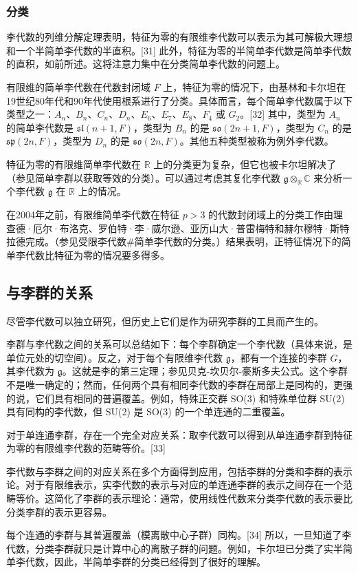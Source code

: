 \subsubsection{分类}
李代数的列维分解定理表明，特征为零的有限维李代数可以表示为其可解极大理想和一个半简单李代数的半直积。[31] 此外，特征为零的半简单李代数是简单李代数的直积，如前所述。这将注意力集中在分类简单李代数的问题上。

有限维的简单李代数在代数封闭域 \(F\) 上，特征为零的情况下，由基林和卡尔坦在19世纪80年代和90年代使用根系进行了分类。具体而言，每个简单李代数属于以下类型之一：\(A_n\)、\(B_n\)、\(C_n\)、\(D_n\)、\(E_6\)、\(E_7\)、\(E_8\)、\(F_4\) 或 \(G_2\)。[32] 其中，类型为 \(A_n\) 的简单李代数是 \(\mathfrak{sl}(n+1,F)\)，类型为 \(B_n\) 的是 \(\mathfrak{so}(2n+1,F)\)，类型为 \(C_n\) 的是 \(\mathfrak{sp}(2n,F)\)，类型为 \(D_n\) 的是 \(\mathfrak{so}(2n,F)\)。其他五种类型被称为例外李代数。

特征为零的有限维简单李代数在 \(\mathbb{R}\) 上的分类更为复杂，但它也被卡尔坦解决了（参见简单李群以获取等效的分类）。可以通过考虑其复化李代数 \(\mathfrak{g} \otimes_{\mathbb{R}} \mathbb{C}\) 来分析一个李代数 \(\mathfrak{g}\) 在 \(\mathbb{R}\) 上的情况。

在2004年之前，有限维简单李代数在特征 \(p > 3\) 的代数封闭域上的分类工作由理查德·厄尔·布洛克、罗伯特·李·威尔逊、亚历山大·普雷梅特和赫尔穆特·斯特拉德完成。（参见受限李代数#简单李代数的分类。）结果表明，正特征情况下的简单李代数比特征为零的情况要多得多。
\subsection{与李群的关系}
尽管李代数可以独立研究，但历史上它们是作为研究李群的工具而产生的。

李群与李代数之间的关系可以总结如下：每个李群确定一个李代数（具体来说，是单位元处的切空间）。反之，对于每个有限维李代数 \(\mathfrak{g}\)，都有一个连接的李群 \(G\)，其李代数为 \(\mathfrak{g}\)。这就是李的第三定理；参见贝克-坎贝尔-豪斯多夫公式。这个李群不是唯一确定的；然而，任何两个具有相同李代数的李群在局部上是同构的，更强的说，它们具有相同的普遍覆盖。例如，特殊正交群 SO(3) 和特殊单位群 SU(2) 具有同构的李代数，但 SU(2) 是 SO(3) 的一个单连通的二重覆盖。

对于单连通李群，存在一个完全对应关系：取李代数可以得到从单连通李群到特征为零的有限维李代数的范畴等价。[33]

李代数与李群之间的对应关系在多个方面得到应用，包括李群的分类和李群的表示论。对于有限维表示，实李代数的表示与对应的单连通李群的表示之间存在一个范畴等价。这简化了李群的表示理论：通常，使用线性代数来分类李代数的表示要比分类李群的表示更容易。

每个连通的李群与其普遍覆盖（模离散中心子群）同构。[34] 所以，一旦知道了李代数，分类李群就只是计算中心的离散子群的问题。例如，卡尔坦已分类了实半简单李代数，因此，半简单李群的分类已经得到了很好的理解。